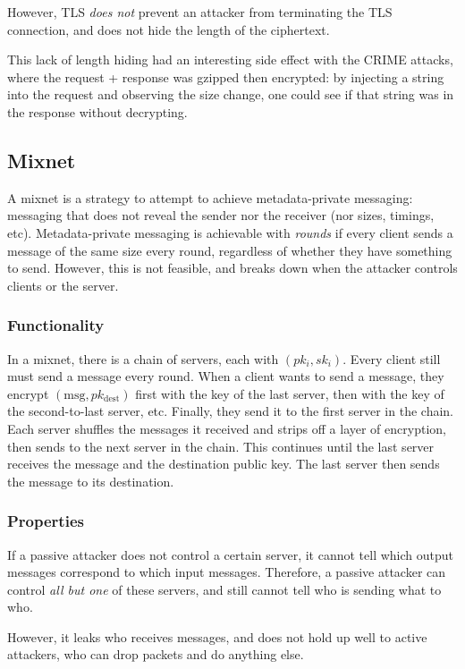 \documentclass{article}
\begin{document}
\begin{multicols*}{2}
However, TLS \textit{does not} prevent an attacker from terminating the TLS connection, and does not hide the length of the ciphertext. 

This lack of length hiding had an interesting side effect with the CRIME attacks, where the request + response was gzipped then encrypted: by injecting a string into the request and observing the size change, one could see if that string was in the response without decrypting. 

\subsection{Mixnet}
A mixnet is a strategy to attempt to achieve metadata-private messaging: messaging that does not reveal the sender nor the receiver (nor sizes, timings, etc). Metadata-private messaging is achievable with \textit{rounds} if every client sends a message of the same size every round, regardless of whether they have something to send. However, this is not feasible, and breaks down when the attacker controls clients or the server. 

\subsubsection{Functionality}
In a mixnet, there is a chain of servers, each with $(pk_i, sk_i)$. Every client still must send a message every round. When a client wants to send a message, they encrypt $(\text{msg}, pk_{\text{dest}})$ first with the key of the last server, then with the key of the second-to-last server, etc. Finally, they send it to the first server in the chain. Each server shuffles the messages it received and strips off a layer of encryption, then sends to the next server in the chain. This continues until the last server receives the message and the destination public key. The last server then sends the message to its destination.

\subsubsection{Properties}
If a passive attacker does not control a certain server, it cannot tell which output messages correspond to which input messages. Therefore, a passive attacker can control \textit{all but one} of these servers, and still cannot tell who is sending what to who. 

However, it leaks who receives messages, and does not hold up well to active attackers, who can drop packets and do anything else.


\end{multicols*}
\end{document}
